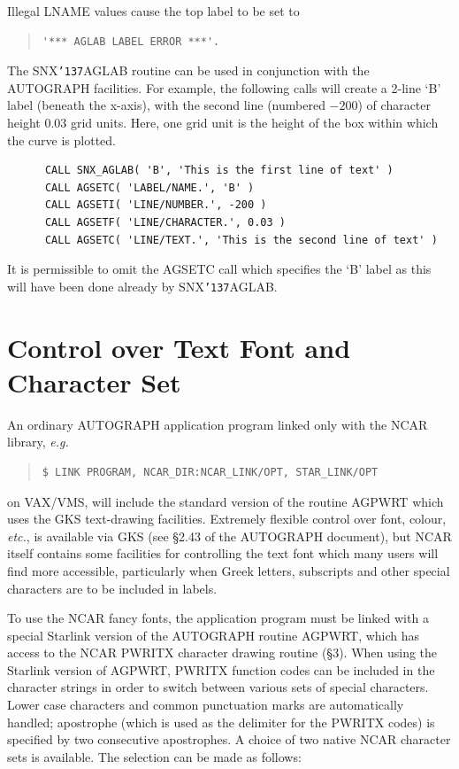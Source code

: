 \documentclass[11pt]{article}
\renewcommand{\_}{{\tt\char'137}}     %
\begin{document}
Illegal LNAME values cause the top label to be set to

\begin {quote}
\begin{verbatim}
'*** AGLAB LABEL ERROR ***'.
\end{verbatim}
\end {quote}

The SNX\_AGLAB routine can be used in conjunction with the AUTOGRAPH facilities.
For example, the following calls will create a 2-line `B' label (beneath the
x-axis), with the second line (numbered $-200$) of character height 0.03 grid
units.
Here, one grid unit is the height of the box within which the curve is
plotted.

\begin{verbatim}
      CALL SNX_AGLAB( 'B', 'This is the first line of text' )
      CALL AGSETC( 'LABEL/NAME.', 'B' )
      CALL AGSETI( 'LINE/NUMBER.', -200 )
      CALL AGSETF( 'LINE/CHARACTER.', 0.03 )
      CALL AGSETC( 'LINE/TEXT.', 'This is the second line of text' )
\end{verbatim}

It is permissible to omit the AGSETC call which specifies the `B' label as
this will have been done already by SNX\_AGLAB.


\section {Control over Text Font and Character Set} \label{text_sect}

An ordinary AUTOGRAPH application program linked only with the NCAR library,
{\em e.g.}

\begin {quote}
\begin{verbatim}
$ LINK PROGRAM, NCAR_DIR:NCAR_LINK/OPT, STAR_LINK/OPT
\end{verbatim}
\end {quote}

on VAX/VMS,
will include the standard version of the routine AGPWRT which uses the GKS
text-drawing facilities.
Extremely flexible control over font, colour, {\em etc.}, is available via GKS
(see \S 2.43 of the AUTOGRAPH document), but NCAR itself contains
some facilities for controlling the text font which many users will find more
accessible, particularly when Greek letters, subscripts and other special
characters are to be included in labels.

To use the NCAR fancy fonts, the application program must be linked with a
special Starlink version of the AUTOGRAPH routine AGPWRT, which has access to
the NCAR PWRITX character drawing routine (\S 3).
When using the Starlink version of AGPWRT, PWRITX function codes can be
included in the character strings in order to switch between various sets of
special characters.
Lower case characters and common punctuation marks are automatically handled;
apostrophe (which is used as the delimiter for the PWRITX codes) is specified
by two consecutive apostrophes.
A choice of two native NCAR character sets is available.
The selection can be made as follows:
\end{document}
